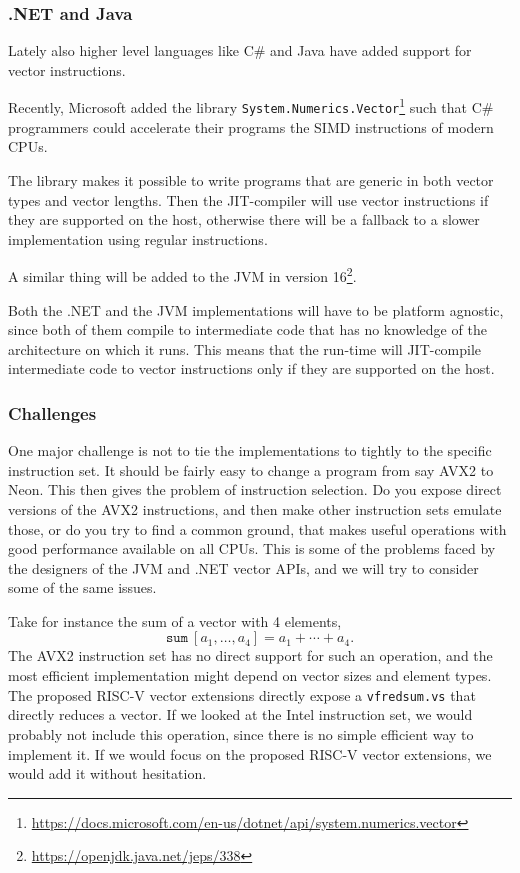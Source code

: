 \documentclass{article}
\begin{document}
\subsubsection{.NET and Java}

Lately also higher level languages like C\# and Java have added support for vector instructions.

Recently, Microsoft added the library \verb!System.Numerics.Vector!\footnote{\url{https://docs.microsoft.com/en-us/dotnet/api/system.numerics.vector}} such that C\# programmers could accelerate their programs the SIMD instructions of modern CPUs.

The library makes it possible to write programs that are generic in both vector types and vector lengths. Then the JIT-compiler will use vector instructions if they are supported on the host, otherwise there will be a fallback to a slower implementation using regular instructions.

A similar thing will be added to the JVM in version 16\footnote{\url{https://openjdk.java.net/jeps/338}}.

Both the .NET and the JVM implementations will have to be platform agnostic, since both of them compile to intermediate code that has no knowledge of the architecture on which it runs. This means that the run-time will JIT-compile intermediate code to vector instructions only if they are supported on the host.

\subsubsection{Challenges}

One major challenge is not to tie the implementations to tightly to the specific instruction set. It should be fairly easy to change a program from say AVX2 to Neon. This then gives the problem of instruction selection. Do you expose direct versions of the AVX2 instructions, and then make other instruction sets emulate those, or do you try to find a common ground, that makes useful operations with good performance available on all CPUs. This is some of the problems faced by the designers of the JVM and .NET vector APIs, and we will try to consider some of the same issues.

Take for instance the sum of a vector with 4 elements,
\[
    \mathtt{sum}\ [a_1, \ldots, a_4] = a_1 + \cdots + a_4.
\]
The AVX2 instruction set has no direct support for such an operation, and the most efficient implementation might depend on vector sizes and element types. The proposed RISC-V vector extensions directly expose a \texttt{vfredsum.vs} that directly reduces a vector. If we looked at the Intel instruction set, we would probably not include this operation, since there is no simple efficient way to implement it. If we would focus on the proposed RISC-V vector extensions, we would add it without hesitation.
\end{document}
